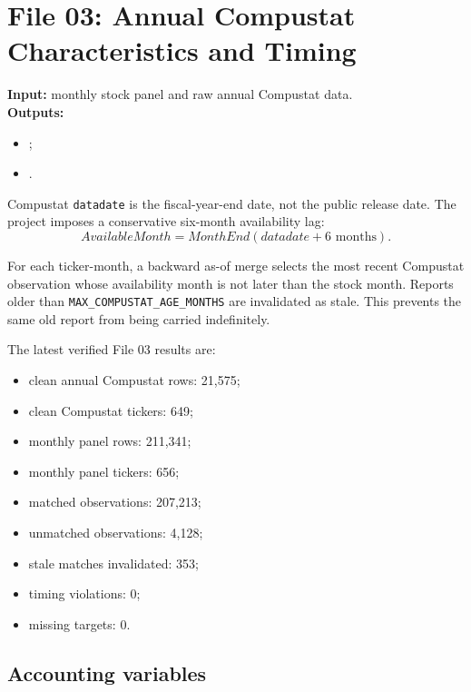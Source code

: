 \documentclass[11pt,a4paper]{article}
\newcommand{\code}[1]{\texttt{#1}}
\begin{document}
\section{File 03: Annual Compustat Characteristics and Timing}
\label{sec:compustat}

\textbf{Input:} monthly stock panel and raw annual Compustat data.\\
\textbf{Outputs:}
\begin{itemize}
  \item {};
  \item {}.
\end{itemize}

Compustat \code{datadate} is the fiscal-year-end date, not the public release date. The project imposes a conservative six-month availability lag:
\[
  AvailableMonth=MonthEnd(datadate+6\text{ months}).
\]

For each ticker-month, a backward as-of merge selects the most recent Compustat observation whose availability month is not later than the stock month. Reports older than \code{MAX\_COMPUSTAT\_AGE\_MONTHS} are invalidated as stale. This prevents the same old report from being carried indefinitely.

The latest verified File 03 results are:
\begin{itemize}
  \item clean annual Compustat rows: 21,575;
  \item clean Compustat tickers: 649;
  \item monthly panel rows: 211,341;
  \item monthly panel tickers: 656;
  \item matched observations: 207,213;
  \item unmatched observations: 4,128;
  \item stale matches invalidated: 353;
  \item timing violations: 0;
  \item missing targets: 0.
\end{itemize}

\subsection{Accounting variables}
\end{document}
